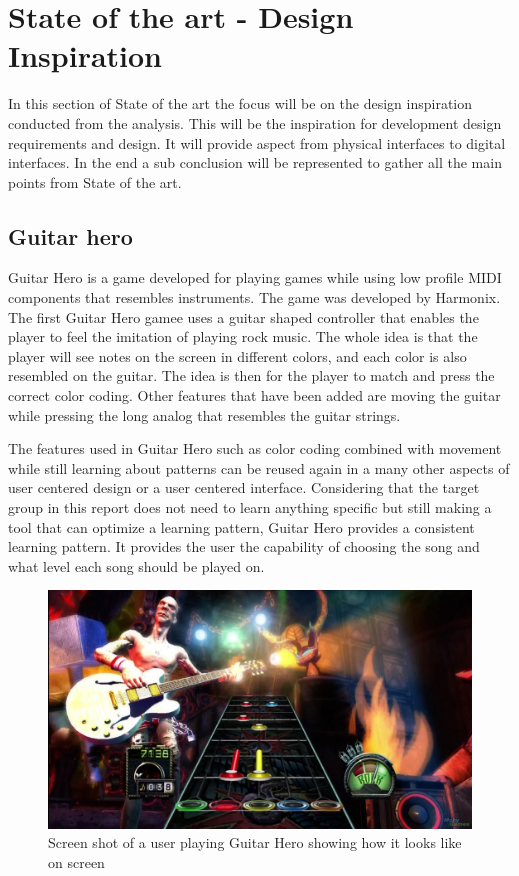 \section{State of the art - Design Inspiration}\label{sec:sota}
In this section of State of the art the focus will be on the design inspiration conducted from the analysis. This will be the inspiration for development design requirements and design. It will provide aspect from physical interfaces to digital interfaces. In the end a sub conclusion will be represented to gather all the main points from State of the art. 

\subsection{Guitar hero}\label{sec:guitarHero} 
Guitar Hero is a game developed for playing games while using low profile MIDI components that resembles instruments. The game was developed by Harmonix. The first Guitar Hero gamee uses a guitar shaped controller that enables the player to feel the imitation of playing rock music. The whole idea is that the player will see notes on the screen in different colors, and each color is also resembled on the guitar. The idea is then for the player to match and press the correct color coding. Other features that have been added are moving the guitar while pressing the long analog that resembles the guitar strings. 

The features used in Guitar Hero such as color coding combined with movement while still learning about patterns can be reused again in a many other aspects of user centered design or a user centered interface. Considering that the target group in this report does not need to learn anything specific but still making a tool that can optimize a learning pattern, Guitar Hero provides a consistent learning pattern. It provides the user the capability of choosing the song and what level each song should be played on. \cite{GuitarHero}
 
\begin{figure}[H]
	\centering
	\includegraphics[width=0.7\linewidth]{figure/Analysis/guitarhero}
	\caption{Screen shot of a user playing Guitar Hero showing how it looks like on screen \cite{GuitarHero}}
	\label{fig:guitarHero}
\end{figure}



